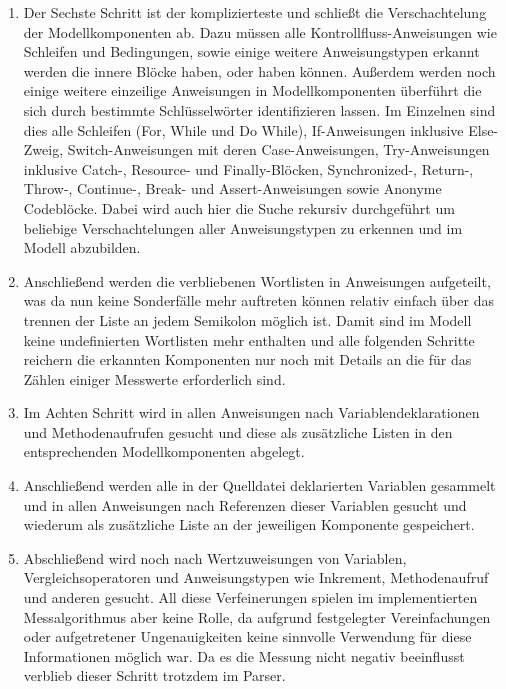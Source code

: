 \documentclass[gb,ngerman]{stthesis}
\begin{document}
\begin{enumerate}
				\item Der Sechste Schritt ist der komplizierteste und schließt die Verschachtelung der Modellkomponenten ab. Dazu müssen alle Kontrollfluss-Anweisungen wie Schleifen und Bedingungen, sowie einige weitere Anweisungstypen erkannt werden die innere Blöcke haben, oder haben können. Außerdem werden noch einige weitere einzeilige Anweisungen in Modellkomponenten überführt die sich durch bestimmte Schlüsselwörter identifizieren lassen. Im Einzelnen sind dies alle Schleifen (For, While und Do While), If-Anweisungen inklusive Else-Zweig, Switch-Anweisungen mit deren Case-Anweisungen, Try-Anweisungen inklusive Catch-, Resource- und Finally-Blöcken, Synchronized-, Return-, Throw-, Continue-, Break- und Assert-Anweisungen sowie Anonyme Codeblöcke. Dabei wird auch hier die Suche rekursiv durchgeführt um beliebige Verschachtelungen aller Anweisungstypen zu erkennen und im Modell abzubilden. 
				\item Anschließend werden die verbliebenen Wortlisten in Anweisungen aufgeteilt, was da nun keine Sonderfälle mehr auftreten können relativ einfach über das trennen der Liste an jedem Semikolon möglich ist. Damit sind im Modell keine undefinierten Wortlisten mehr enthalten und alle folgenden Schritte reichern die erkannten Komponenten nur noch mit Details an die für das Zählen einiger Messwerte erforderlich sind.
				\item Im Achten Schritt wird in allen Anweisungen nach Variablendeklarationen und Methodenaufrufen gesucht und diese als zusätzliche Listen in den entsprechenden Modellkomponenten abgelegt.
				\item Anschließend werden alle in der Quelldatei deklarierten Variablen gesammelt und in allen Anweisungen nach Referenzen dieser Variablen gesucht und wiederum als zusätzliche Liste an der jeweiligen Komponente gespeichert. 
				\item Abschließend wird noch nach Wertzuweisungen von Variablen, Vergleichsoperatoren und Anweisungstypen wie Inkrement, Methodenaufruf und anderen gesucht. All diese Verfeinerungen spielen im implementierten Messalgorithmus aber keine Rolle, da aufgrund festgelegter Vereinfachungen oder aufgetretener Ungenauigkeiten keine sinnvolle Verwendung für diese Informationen möglich war. Da es die Messung nicht negativ beeinflusst verblieb dieser Schritt trotzdem im Parser. 
			\end{enumerate}
\end{document}
